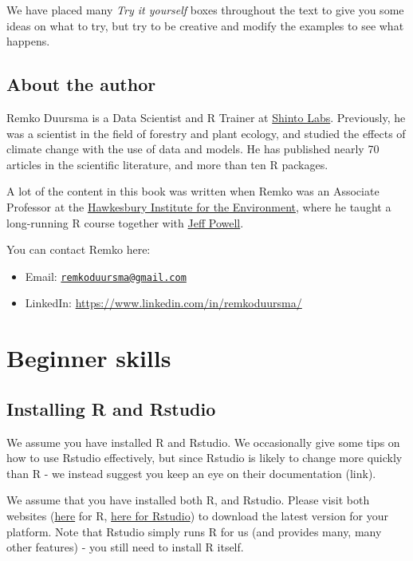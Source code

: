 \documentclass[]{book}
\providecommand{\tightlist}{%
  \setlength{\itemsep}{0pt}\setlength{\parskip}{0pt}}
\begin{document}
We have placed many \emph{Try it yourself} boxes throughout the text to give you some ideas on what to try, but try to be creative and modify the examples to see what happens.

\hypertarget{about-the-author}{%
\section{About the author}\label{about-the-author}}

Remko Duursma is a Data Scientist and R Trainer at \href{http://www.shintolabs.nl}{Shinto Labs}. Previously, he was a scientist in the field of forestry and plant ecology, and studied the effects of climate change with the use of data and models. He has published nearly 70 articles in the scientific literature, and more than ten R packages.

A lot of the content in this book was written when Remko was an Associate Professor at the \href{https://www.westernsydney.edu.au/hie}{Hawkesbury Institute for the Environment}, where he taught a long-running R course together with \href{https://www.westernsydney.edu.au/hie/people/researchers/assoc_prof_jeff_powell}{Jeff Powell}.

You can contact Remko here:

\begin{itemize}
\tightlist
\item
  Email: \href{mailto:remkoduursma@gmail.com}{\nolinkurl{remkoduursma@gmail.com}}
\item
  LinkedIn: \url{https://www.linkedin.com/in/remkoduursma/}
\end{itemize}

\hypertarget{intro}{%
\chapter{Beginner skills}\label{intro}}

\hypertarget{installingr}{%
\section{Installing R and Rstudio}\label{installingr}}

We assume you have installed R and Rstudio. We occasionally give some tips on how to use Rstudio effectively, but since Rstudio is likely to change more quickly than R - we instead suggest you keep an eye on their documentation (link).

We assume that you have installed both R, and Rstudio. Please visit both websites (\href{http://cran.r-project.org}{here} for R, \href{www.rstudio.org}{here for Rstudio}) to download the latest version for your platform. Note that Rstudio simply runs R for us (and provides many, many other features) - you still need to install R itself.
\end{document}
